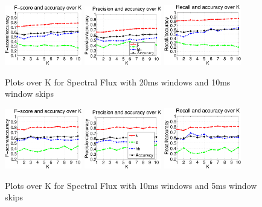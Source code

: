 
\begin{figure}


	\centering\includegraphics[width=0.3\textwidth]{tex/appendices/test/sflux2010FP.png}
	\centering\includegraphics[width=0.3\textwidth]{tex/appendices/test/sflux2010_P.png}
	\centering\includegraphics[width=0.3\textwidth]{tex/appendices/test/sflux2010_R.png}
	
	\caption{Plots over K for Spectral Flux with 20ms windows and 10ms window skips}
\end{figure}
\begin{figure}


	\centering\includegraphics[width=0.3\textwidth]{tex/appendices/test/sflux105FP.png}
	\centering\includegraphics[width=0.3\textwidth]{tex/appendices/test/sflux105_P.png}
	\centering\includegraphics[width=0.3\textwidth]{tex/appendices/test/sflux105_R.png}
		
		\caption{Plots over K for Spectral Flux with 10ms windows and 5ms window skips}
\end{figure}
